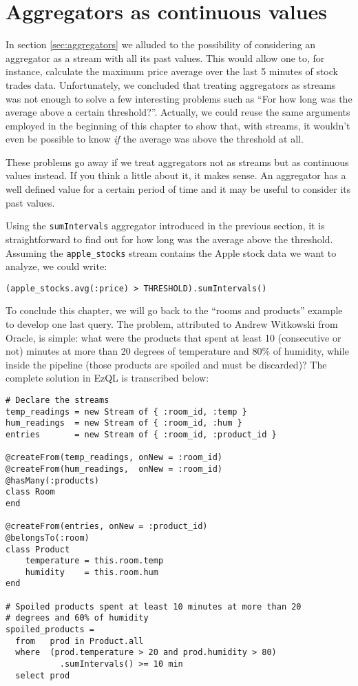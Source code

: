 \documentclass{report}
\begin{document}
\section{Aggregators as continuous values}
\label{sec:aggregators-continuous-values}

In section \ref{sec:aggregators} we alluded to the possibility of
considering an aggregator as a stream with all its past values. This
would allow one to, for instance, calculate the maximum price average
over the last 5 minutes of stock trades data. Unfortunately, we
concluded that treating aggregators as streams was not enough to solve
a few interesting problems such as ``For how long was the average
above a certain threshold?''. Actually, we could reuse the same
arguments employed in the beginning of this chapter to show that, with
streams, it wouldn't even be possible to know \emph{if} the average
was above the threshold at all.

These problems go away if we treat aggregators not as streams but as
continuous values instead. If you think a little about it, it makes
sense. An aggregator has a well defined value for a certain period of
time and it may be useful to consider its past values.

Using the \verb=sumIntervals= aggregator introduced in the previous
section, it is straightforward to find out for how long was the
average above the threshold. Assuming the \verb=apple_stocks= stream
contains the Apple stock data we want to analyze, we could write:

\begin{verbatim}
(apple_stocks.avg(:price) > THRESHOLD).sumIntervals()
\end{verbatim}

To conclude this chapter, we will go back to the ``rooms and
products'' example to develop one last query. The problem, attributed
to Andrew Witkowski from Oracle, is simple: what were the products
that spent at least 10 (consecutive or not) minutes at more than 20
degrees of temperature and 80\% of humidity, while inside the pipeline
(those products are spoiled and must be discarded)? The complete
solution in EzQL is transcribed below:

\begin{verbatim}
# Declare the streams
temp_readings = new Stream of { :room_id, :temp }
hum_readings  = new Stream of { :room_id, :hum }
entries       = new Stream of { :room_id, :product_id }

@createFrom(temp_readings, onNew = :room_id)
@createFrom(hum_readings,  onNew = :room_id)
@hasMany(:products)
class Room
end

@createFrom(entries, onNew = :product_id)
@belongsTo(:room)
class Product
    temperature = this.room.temp
    humidity    = this.room.hum
end

# Spoiled products spent at least 10 minutes at more than 20
# degrees and 60% of humidity
spoiled_products =
  from   prod in Product.all
  where  (prod.temperature > 20 and prod.humidity > 80)
           .sumIntervals() >= 10 min
  select prod
\end{verbatim}
\end{document}
